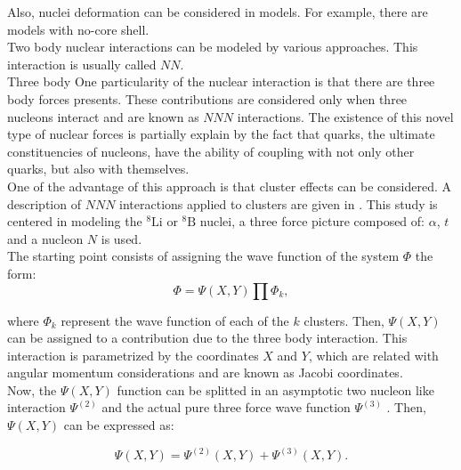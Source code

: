 \documentclass[openany]{book}
\begin{document}
Also, nuclei deformation can be considered in models. For example, there are models with no-core shell. \\

Two body nuclear interactions can be modeled by various approaches. This interaction is usually called $NN$. \\

Three body \cite{grigorenko_danilin_efros_shulgina_zhukov_1998}
One particularity of the nuclear interaction is that there are three body forces presents.  These contributions are considered only when three nucleons interact and are known as $NNN$ interactions. The existence of this novel type of nuclear forces is partially explain by the fact that quarks, the ultimate constituencies of nucleons, have the ability of coupling with not only other quarks, but also with themselves. \\

One of the advantage of this approach is that cluster effects can be considered. A description of $NNN$ interactions applied to clusters are given in  \cite{grigorenko_danilin_efros_shulgina_zhukov_1998}. This study is centered in modeling the $\mathrm{{}^{8}Li}$ or $\mathrm{{}^{8}B}$ nuclei, a three force picture composed of: $\alpha$, $t$ and a nucleon $N$ is used.  \\

The starting point consists of assigning the wave function of the system  $\Phi$  the form:  \\

\begin{equation}\label{eq:micro_threeBody_wavefunction}
	\Phi = \Psi(X, Y) \prod \Phi_k, 
\end{equation}

where $\Phi_k$ represent the wave function of each of the $k$ clusters. Then, $\Psi(X, Y)$ can be assigned to a contribution due to the three body interaction. This interaction is parametrized by the coordinates $X$ and $Y$,  which are related with angular momentum considerations and are known as Jacobi coordinates. \\

Now, the $\Psi(X, Y)$ function can be splitted in an asymptotic two nucleon like interaction $\Psi^{(2)}$ and the actual pure three force wave function $\Psi^{(3)}$ . Then, $\Psi(X, Y)$ can be expressed as: 

\begin{equation}\label{eq:micro_threeBody_splitting}
	\Psi(X, Y) = \Psi^{(2)}(X, Y) +  \Psi^{(3)}(X, Y).
\end{equation}
\end{document}
